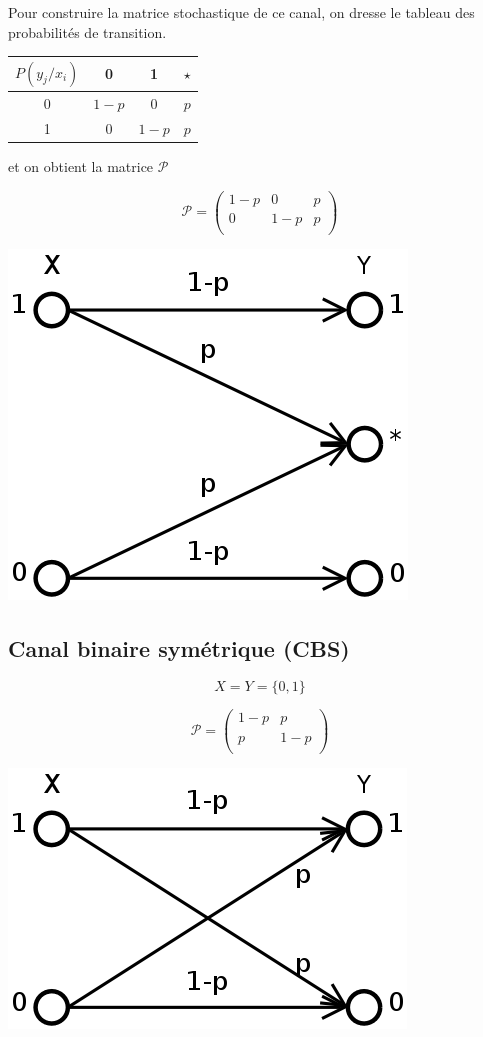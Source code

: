 \documentclass[a4paper,10pt,twocolumn]{article}
\theoremstyle{break}
\begin{document}
Pour construire la matrice stochastique de ce canal, on dresse le tableau des probabilités de transition.
\begin{center}
\begin{tabular}{|c|ccc|}
 \hline 
 $P(y_j/x_i)$ & 0 & 1 & $\star$ \\
 \hline
 0 & $1-p$ & 0 & $p$ \\
 1 & 0 & $1-p$ & $p$ \\
 \hline
\end{tabular}
\end{center}

et on obtient la matrice $\mathcal{P}$

$$ \mathcal{P} = \begin{pmatrix}
 1-p & 0 & p\\
 0 & 1-p & p\\
\end{pmatrix}$$

\begin{center}
\includegraphics[width=0.5\linewidth]{cbse}
\end{center}

\subsection{Canal binaire symétrique (CBS)}

$$X = Y = \lbrace 0, 1 \rbrace $$

$$ \mathcal{P} = \left(
\begin{array}{cc}
 1-p & p\\
 p & 1-p\\
\end{array}
\right)$$

\begin{center}
\includegraphics[width=0.5\linewidth]{cbs}
\end{center}
\end{document}
